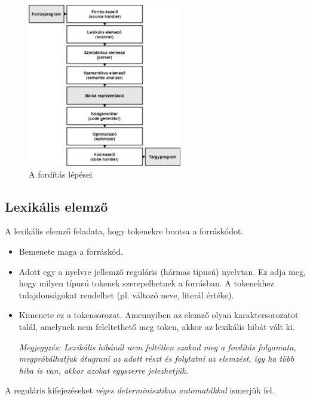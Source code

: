 \documentclass[12pt,margin=0px]{article}
\begin{document}
	\begin{figure}[H]
		\centering
		\includegraphics[width=0.6\textwidth]{img/forditas_teljes_folyamata.png}
		\caption{A fordítás lépései}
		\label{fig:forditas_teljes_folyamatabra}
	\end{figure}

    \subsection*{Lexikális elemző}

    \noindent A lexikális elemző feladata, hogy tokenekre bontsa a forráskódot.
	
    \begin{itemize}
        \item Bemenete maga a forráskód.
        \item Adott egy a nyelvre jellemző reguláris (hármas típusú) nyelvtan. Ez adja meg, hogy milyen típusú tokenek szerepelhetnek a forrásban.
        A tokenekhez tulajdonságokat rendelhet (pl. változó neve, literál értéke).
        \item Kimenete ez a tokensorozat. Amennyiben az elemző olyan karaktersorozatot talál, amelynek nem feleltethető meg token, akkor az lexikális hibát vált ki.
    	
        \textit{Megjegyzés: Lexikális hibánál nem feltétlen szakad meg a fordítás folyamata, megpróbálhatjuk átugrani az adott részt és folytatni az elemzést, így ha több hiba is van, akkor azokat egyszerre jelezhetjük.}
    \end{itemize}

    \noindent A reguláris kifejezéseket \emph{véges determinisztikus automatákkal} ismerjük fel.\\
\end{document}
